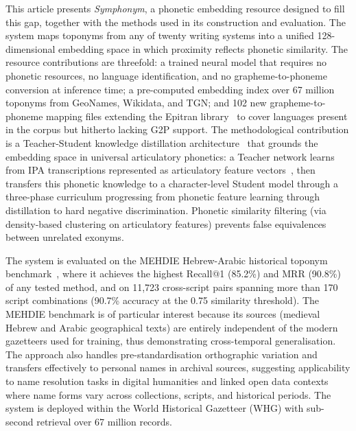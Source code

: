 \documentclass[11pt,a4paper]{article}
\begin{document}
This article presents \emph{Symphonym}, a phonetic embedding resource designed to fill this gap, together with the methods used in its construction and evaluation. The system maps toponyms from any of twenty writing systems into a unified 128-dimensional embedding space in which proximity reflects phonetic similarity. The resource contributions are threefold: a trained neural model that requires no phonetic resources, no language identification, and no grapheme-to-phoneme conversion at inference time; a pre-computed embedding index over 67 million toponyms from GeoNames, Wikidata, and TGN; and 102 new grapheme-to-phoneme mapping files extending the Epitran library~\citep{mortensen2018} to cover languages present in the corpus but hitherto lacking G2P support. The methodological contribution is a Teacher-Student knowledge distillation architecture~\citep{hinton2015distilling} that grounds the embedding space in universal articulatory phonetics: a Teacher network learns from IPA transcriptions represented as articulatory feature vectors~\citep{mortensen2016}, then transfers this phonetic knowledge to a character-level Student model through a three-phase curriculum progressing from phonetic feature learning through distillation to hard negative discrimination. Phonetic similarity filtering (via density-based clustering on articulatory features) prevents false equivalences between unrelated exonyms.

The system is evaluated on the MEHDIE Hebrew-Arabic historical toponym benchmark~\citep{mehdie2025}, where it achieves the highest Recall@1 (85.2\%) and MRR (90.8\%) of any tested method, and on 11,723 cross-script pairs spanning more than 170 script combinations (90.7\% accuracy at the 0.75 similarity threshold). The MEHDIE benchmark is of particular interest because its sources (medieval Hebrew and Arabic geographical texts) are entirely independent of the modern gazetteers used for training, thus demonstrating cross-temporal generalisation. The approach also handles pre-standardisation orthographic variation and transfers effectively to personal names in archival sources, suggesting applicability to name resolution tasks in digital humanities and linked open data contexts where name forms vary across collections, scripts, and historical periods. The system is deployed within the World Historical Gazetteer (WHG) with sub-second retrieval over 67 million records.
\end{document}
